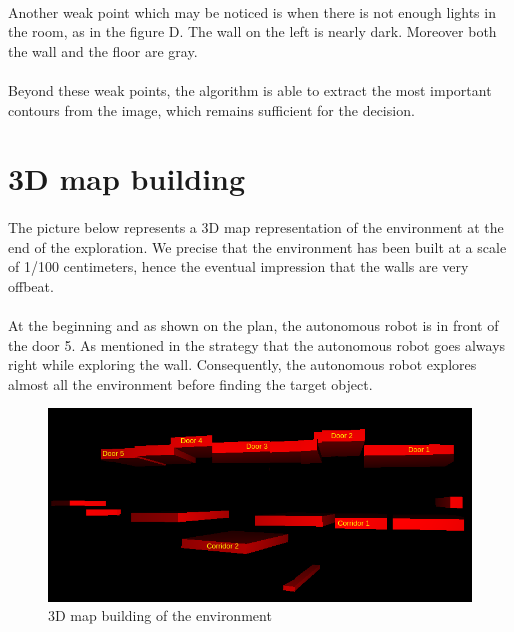 \documentclass[12pt]{report}
\begin{document}
	\paragraph{}
	Another weak point which may be noticed is when there is not enough lights in the room, as in the figure D. The wall on the left is nearly dark. Moreover both the wall and the floor are gray.
	
	\paragraph{}
	Beyond these weak points, the algorithm is able to extract the most important contours from the image, which remains sufficient for the decision. 
	\section{3D map building}
	\paragraph{}
	The picture below represents a 3D map representation of the environment at the end of the exploration. We precise that the environment has been built at a scale of 1/100 centimeters, hence the eventual impression that the walls are very offbeat.
	\paragraph{}
	At the beginning and as shown on the plan, the autonomous robot is in front of the door 5. As mentioned in the strategy that the autonomous robot goes always right while exploring the wall. Consequently, the autonomous robot explores almost all the environment before finding the target object.
	\begin{figure}[H]
		\begin{center}
			\includegraphics[scale=0.90]{res/3D_recons.png}
			\caption{3D map building of the environment}
		\end{center}
	\end{figure}
	
\end{document}
